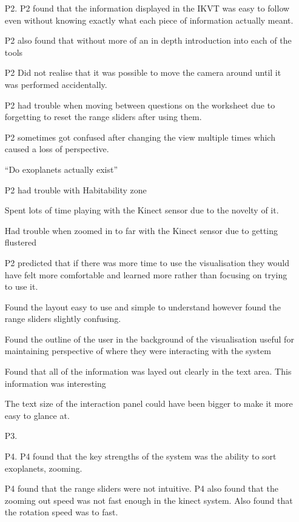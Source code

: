 \begin{enumerate}
 \item[P2.] 
 P2 found that the information displayed in the IKVT was easy to follow even
without knowing exactly what each piece of information actually meant.
 
 P2 also found that without more of an in depth introduction into each of the
tools 
 
 P2 Did not realise that it was possible to move the camera around until it was
performed accidentally.
 
 P2 had trouble when moving between questions on the worksheet due to forgetting
to reset the range sliders after using them.
 
 P2 sometimes got confused after changing the view multiple times which caused a
loss of perspective.
 
  ``Do exoplanets actually exist''
  
  P2 had trouble with Habitability zone

   Spent lots of time playing with the Kinect sensor due to the novelty of it.
   
   Had trouble when zoomed in to far with the Kinect sensor due to getting
flustered
   
   P2 predicted that if there was more time to use the visualisation they would
have felt more comfortable and learned more rather than focusing on trying to
use it.
   
   Found the layout easy to use and simple to understand however found the range
sliders slightly confusing.
   
   Found the outline of the user in the background of the visualisation useful
for maintaining perspective of where they were interacting with the system
   
   Found that all of the information was layed out clearly in the text area.
This information was interesting

   The text size of the interaction panel could have been bigger to make it more
easy to glance at.
   
  \item[P3.]
   \item[P4.]
   P4 found that the key strengths of the system was the ability to sort
exoplanets, zooming.
   
   P4 found that the range sliders were not intuitive. P4 also found that the
zooming out speed was not fast enough in the kinect system. Also found that the
rotation speed was to fast.
   

\end{enumerate}
